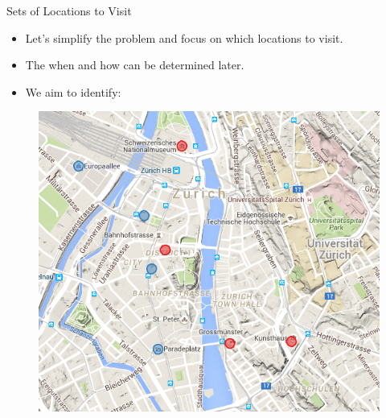 \documentclass{beamer}
\begin{document}
\begin{frame}{Sets of Locations to Visit}
  \begin{itemize}
    \item Let's simplify the problem and focus on which locations to visit.
    \item The when and how can be determined later.
    \item We aim to identify:
  \end{itemize}
  \begin{figure}
    \centering
    \includegraphics[scale=0.3]{sets_1}
  \end{figure}
\end{frame}
\end{document}
